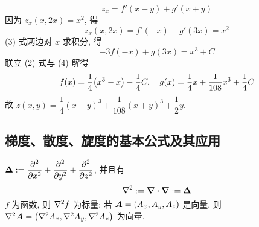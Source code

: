 \begin{solution}
\begin{enumerate}[label=(\arabic{*})]
$$        z_x=f'(x-y)+g'(x+y)
        $$
        因为 $z_x(x,2x)=x^2$, 得 
        \begin{equation*}
            z_x(x,2x)=f'(-x)+g'(3x)=x^2
            \tag{3}
        \end{equation*}
        (3) 式两边对 $x$ 求积分, 得 
        \begin{equation*}
            -3f(-x)+g(3x)=x^3+C 
            \tag{4}
        \end{equation*}
        联立 (2) 式与 (4) 解得 
        $$
        f(x)=\dfrac{1}{4}\qty(x^3-x)-\dfrac{1}{4}C, \quad g(x)=\dfrac{1}{4}x+\dfrac{1}{108}x^3+\dfrac{1}{4}C
        $$
        故 $z(x,y)=\dfrac{1}{4}(x-y)^3+\dfrac{1}{108}(x+y)^3+\dfrac{1}{2}y.$
    \end{enumerate}
\end{solution}

\subsection{梯度、散度、旋度的基本公式及其应用}

\begin{definition}[Laplace 算符]
    $\displaystyle\vb*{\Delta}:=\pdv[2]{}{x}+\pdv[2]{}{y}+\pdv[2]{}{z}$, 并且有
    $$\laplacian:=\div\grad:=\vb*{\Delta}$$
    $f$ 为函数, 则 $\laplacian f$ 为标量; 若 $\vb*{A}=(A_x,A_y,A_z)$ 是向量, 则 $\laplacian{\vb*{A}}=\qty(\laplacian{A_x},\laplacian{A_y},\laplacian{A_z})$ 为向量.
\end{definition}

